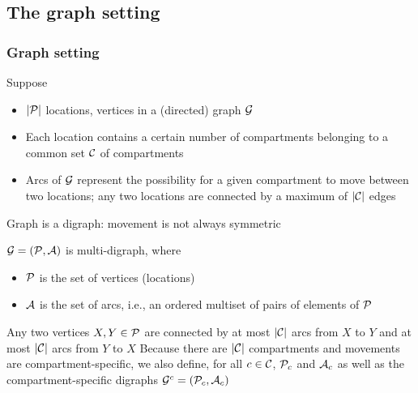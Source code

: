 \documentclass[aspectratio=169]{beamer}\usepackage[]{graphicx}\usepackage[]{xcolor}
\begin{document}
\subsection{The graph setting}


\begin{frame}\frametitle{Graph setting}
Suppose
\begin{itemize} 
\item $|\P|$ locations, vertices in a (directed) graph $\G$
\item Each location contains a certain number of compartments belonging to a common set $\C$ of compartments
\item Arcs of $\G$ represent the possibility for a given compartment to move between two locations; any two locations are connected by a maximum of $|\C|$ edges
\end{itemize}
\vfill
Graph is a digraph: movement is not always symmetric
\end{frame}


\begin{frame}
$\G=(\P,\A)$ is multi-digraph, where 
\begin{itemize}
	\item $\P$ is the set of vertices (locations)
	\item $\A$ is the set of arcs, i.e., an ordered multiset of pairs of elements of $\P$
\end{itemize}
\vfill
Any two vertices $X,Y\in\P$ are connected by at most $|\C|$ arcs from $X$ to $Y$ and at most $|\C|$ arcs from $Y$ to $X$
\vfill
Because there are $|\C|$ compartments and movements are compartment-specific, we also define, for all $c\in\C$, $\P_c$ and $\A_c$ as well as the compartment-specific digraphs $\G^c=(\P_c,\A_c)$
\end{frame}



\end{document}
